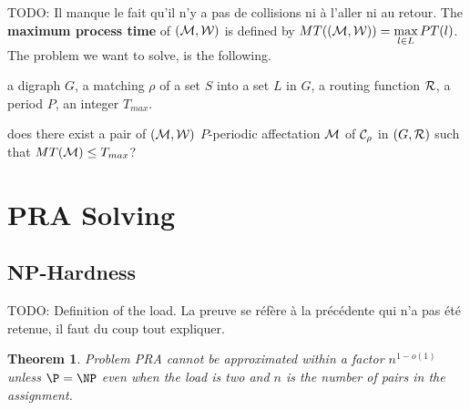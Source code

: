 \documentclass[a4paper,10pt]{article}
\newtheorem{theorem}{Theorem}
\newcommand{\todo}[1]{{\color{red} TODO: {#1}}}
\begin{document}
      \todo{Il manque le fait qu'il n'y a pas de collisions ni à l'aller ni au retour.}
% 	
    The {\bf maximum process time} of $({\cal M},{\cal W})$ is defined by $MT(({\cal M},{\cal W}))=\max\limits_{l \in L} PT(l)$. The problem we want to solve, is the following. 


        a digraph $G$, a matching $\rho$ of a set $S$ into a set $L$ in $G$, a routing function $\cal R$, a period $P$, an integer $T_{max}$.

       does there exist a pair of $({\cal M},{\cal W})$ $P$-periodic affectation ${\cal M}$ of ${\cal C}_{\rho}$ in $(G,{\cal R})$ such that $MT({\cal M}) \leq T_{max}$?



	

  
\section{PRA Solving}
  
  \subsection{NP-Hardness}
	
   \todo{Definition of the load. La preuve se réfère à la précédente qui n'a pas été retenue, il faut du coup tout expliquer.}
   
   
    \begin{theorem}
    Problem PRA cannot be approximated within a factor $n^{1-o(1)}$ unless $\P = \NP$ even when the load is two
    and $n$ is the number of pairs in the assignment.
    \end{theorem}
\end{document}
